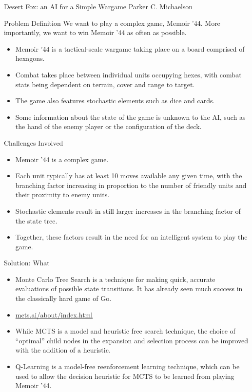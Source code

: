 \documentclass{beamer}
\begin{document}
\begin{frame}{Desert Fox: an AI for a Simple Wargame}
Parker C. Michaelson
\end{frame}



\begin{frame}{Problem Definition}
	We want to play a complex game, Memoir '44.
	More importantly, we want to win Memoir '44 as often as possible.

	\begin{itemize}
		\item Memoir '44 is a tactical-scale wargame taking place on a board comprised of hexagons.
		\item Combat takes place between individual units occupying hexes, with combat stats being dependent on terrain, cover and range to target.
		\item The game also features stochastic elements such as dice and cards.
		\item Some information about the state of the game is unknown to the AI, such as the hand of the enemy player or the configuration of the deck.
	\end{itemize}
\end{frame}



\begin{frame}{Challenges Involved}
	\begin{itemize}
		\item Memoir '44 is a complex game.
		\item Each unit typically has at least 10 moves available any given time, with the branching factor increasing in proportion to the number of friendly units and their proximity to enemy units.
		\item Stochastic elements result in still larger increases in the branching factor of the state tree.
		\item Together, these factors result in the need for an intelligent system to play the game.
	\end{itemize}
\end{frame}



\begin{frame}{Solution: What}
	\begin{itemize}
		\item Monte Carlo Tree Search is a technique for making quick, accurate evaluations of possible state transitions. It has already seen much success in the classically hard game of Go.
		\item \url{mcts.ai/about/index.html}
		\item While MCTS is a model and heuristic free search technique, the choice of ``optimal'' child nodes in the expansion and selection process can be improved with the addition of a heuristic.
		\item Q-Learning is a model-free reenforcement learning technique, which can be used to allow the decision heuristic for MCTS to be learned from playing Memoir '44.
	\end{itemize}
\end{frame}
\end{document}
